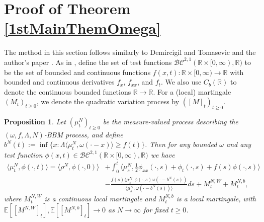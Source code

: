 \documentclass{article}
\newtheorem{propn}[theorem]{Proposition}
\newcommand{\B}[1]{\mathbb{#1}}
\newcommand{\C}[1]{\mathcal{#1}}
\begin{document}
\section{Proof of Theorem \ref{1stMainThemOmega}}

The method in this section follows similarly to Demircigil and Tomasevic \cite{demircigilTomasevic} and the author's paper \cite{me3}. As in \cite{me3}, define the set of test functions $\C{BC}^{2,1}(\B{R}\times [0,\infty),\B{R})$ to be the set of bounded and continuous functions $f(x,t):\B{R}\times [0,\infty)\to\B{R}$ with bounded and continuous derivatives $f_x$, $f_{xx}$, and $f_t$. We also use $C_b(\B{R})$ to denote the continuous bounded functions $\B{R}\to\B{R}$. For a (local) martingale $(M_t)_{t\geq 0}$, we denote the quadratic variation process by $([M]_t)_{t\geq 0}$.

 

\begin{propn} \label{probRepPropn}
    Let $(\mu_t^N)_{t\geq 0}$ be the measure-valued process describing the $(\omega,f,\Lambda,N)$-BBM process, and define $b^N(t):=\inf\{x:\Lambda\langle \mu_t^N,\omega(\cdot-x)\rangle\geq f(t)\}$. Then for any bounded $\omega$ and any test function $\phi(x,t)\in \C{BC}^{2,1}(\B{R}\times [0,\infty),\B{R})$ we have
    \begin{align} \label{probRepIto} \langle \mu_t^N,\phi(\cdot,t)\rangle = \langle \rho^N, \phi(\cdot,0)\rangle &+ \int_0^t \langle \mu_s^N, \frac12 \phi_{xx}(\cdot,s) + \phi_t(\cdot,s)+f(s)\phi(\cdot,s)\rangle \\
    &- \frac{f(s)\langle \mu_s^N,\phi(\cdot,s)\omega(\cdot-b^N(s))}{\langle \mu_s^N,\omega(\cdot-b^N(s))\rangle} ds
    \nonumber + M_t^{N,W} + M_t^{N,b},
    \end{align}
    where $M^{N,W}_t$ is a continuous local martingale and $M^{N,b}_t$ is a local martingale, with $\B{E}[[M^{N,W}]_t],\B{E}[[M^{N,b}]_t]\to 0$ as $N\to\infty$ for fixed $t\geq 0$. 
\end{propn}
\end{document}
